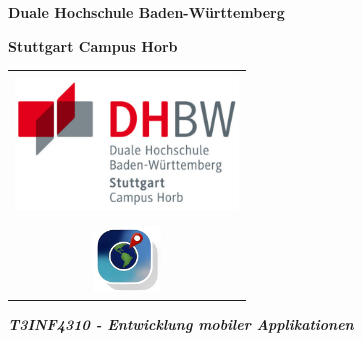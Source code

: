\titlepage
\begin{center}
    \textbf{\large{}Duale Hochschule Baden-Württemberg }{\large\par}
    \par
\end{center}
\begin{center}
    \textbf{\large{}Stuttgart Campus Horb}{\large\par}
    \par
\end{center}
\begin{center}
    \begin{tabular}{l||r}
        \multicolumn{2}{c}{\vspace{1cm}}
        \tabularnewline
        \multicolumn{2}{c}{\includegraphics[height=3.5cm]{images/dhbwlogo}}
        \tabularnewline
        \multicolumn{2}{c}{}
        \tabularnewline
        \multicolumn{2}{c}{\includegraphics[width=0.3\textwidth, scale=1]{images/logo.png}}
        \tabularnewline
    \end{tabular}
    \par
\end{center}
\vspace{0.5cm}

\begin{flushleft}
    \textbf{\Large{}\title{}}{\Large\par}
    \par
\end{flushleft}

\begin{flushleft}
    \textbf{\textit{T3INF4310 - Entwicklung mobiler Applikationen}}
    \par
\end{flushleft}

